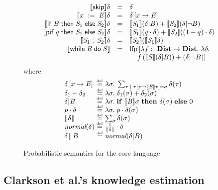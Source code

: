 \documentclass[10pt]{sigplanconf}
\begin{document}
\begin{figure}
\centering \begin{displaymath} \begin{array}{rcl}
\pevalp{\sskip}{\delta} & = & \delta \\
%
\pevalp{\sassign{x}{\aexp}}{\delta} & = & \delta \bparen{x \ra \aexp} \\
%
\pevalp{\sif{B}{\stmt_1}{\stmt_2}}{\delta} & = &
\pevalp{\stmt_1}{(\dcond{\delta}{B})} + \pevalp{\stmt_2}{(\dcond{\delta}{\neg B})} \\
%
\evalp{\spif{q}{\stmt_1}{\stmt_2}}{\delta} & = &
\evalp{\stmt_1}{(q \cdot\delta)} + \evalp{\stmt_2}{((1-q) \cdot \delta)} \\
%
\pevalp{\sseq{\stmt_1}{\stmt_2}}{\delta} & = & \pevalp{\stmt_2}{\paren{\evalp{\stmt_1}{\delta}}} \\
\pevalp{\swhile{\bexp}{\stmt}}{} & = & \lfp\left[\lambda
f :\ \dists
\rightarrow \dists \lsep \lambda \delta \lsep \right. \\
& & \left. \quad f\paren{\pevalp{\stmt}{(\dcond{\delta}{B})}} +
       \paren{\dcond{\delta}{\neg B}}\right]
\end{array}
\end{displaymath}
where
\begin{displaymath}
\begin{array}{l@{\;\defeq\;}l}
\delta \bparen{x \ra \aexp} & \lambda \sigma \lsep \sum_{\tau \; | \; \tau
  \bparen{x \ra \eeval{\aexp}{\tau}} = \sigma} \delta (\tau) \\
\delta_1 + \delta_2 & \lambda \sigma \lsep \delta_1(\sigma) +
\delta_2(\sigma) \\
\dcond{\delta}{\bexp} & \lambda \sigma \lsep \aif \eeval{\bexp}{\sigma}\; \athen
\delta(\sigma)\; \aelse 0 \\
p \cdot \delta & \lambda \sigma \lsep p \cdot \delta(\sigma) \\
\pmass{\delta} & \sum_{\sigma} \delta(\sigma) \\
\normal{\delta} & \frac{1}{\pmass{\delta}} \cdot \delta \\
\revise{\delta}{B} & \normal{\dcond{\delta}{B}}
\end{array}
\end{displaymath}
\vspace*{-0.1in}
\caption{Probabilistic semantics for the core language} \label{fig-sem-nondet2-core}
\end{figure}

\subsection{Clarkson et al.'s knowledge estimation}
\end{document}
